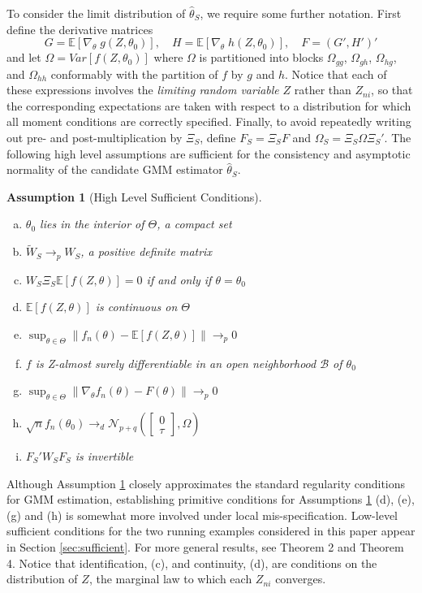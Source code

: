 \documentclass[12pt]{article}
\newcommand{\expect}{\mathbb{E}}
\newtheorem{assump}{Assumption}[section]
\theoremstyle{definition}
\begin{document}
To consider the limit distribution of $\widehat{\theta}_S$, we require some further notation. First define the derivative matrices
	$$G = \expect\left[\nabla_{\theta} \; g(Z,\theta_0)\right], \quad H = \expect\left[\nabla_{\theta} \; h(Z,\theta_0)\right], \quad F = (G', H')'$$
and let $\Omega = Var\left[ f(Z,\theta_0) \right]$ where $\Omega$ is partitioned into blocks $\Omega_{gg}$, $\Omega_{gh}$, $\Omega_{hg}$, and $\Omega_{hh}$ conformably with the partition of $f$ by $g$ and $h$. Notice that each of these expressions involves the \emph{limiting random variable} $Z$ rather than $Z_{ni}$, so that the corresponding expectations are taken with respect to a distribution for which all moment conditions are correctly specified. Finally, to avoid repeatedly writing out pre- and post-multiplication by $\Xi_S$, define $F_S = \Xi_S F$ and $\Omega_S = \Xi_S \Omega\Xi_S'$. The following high level assumptions are sufficient for the consistency and asymptotic normality of the candidate GMM estimator $\widehat{\theta}_S$. 
\begin{assump}[High Level Sufficient Conditions]
\label{assump:highlevel} 
\mbox{}
	\begin{enumerate}[(a)]
		\item $\theta_0$ lies in the interior of $\Theta$, a compact set
		\item $\widetilde{W}_S \rightarrow_{p} W_S$, a positive definite matrix
		\item $W_S \Xi_S \expect[f(Z,\theta)]=0$ if and only if $\theta = \theta_0$
		\item $\expect[f(Z,\theta)]$ is continuous on $\Theta$
		\item $\sup_{\theta \in \Theta}\| f_n(\theta)- \expect[f(Z,\theta)]\|\rightarrow_{p} 0$
		\item $f$ is Z-almost surely differentiable in an open neighborhood $\mathcal{B}$ of $\theta_0$
		\item $\sup_{\theta \in \Theta} \|\nabla_{\theta}f_n(\theta) - F(\theta)\|\rightarrow_{p} 0$
		\item $\sqrt{n}f_n(\theta_0) \rightarrow_d\mathcal{N}_{p+q}\left( \left[\begin{array}{c}0\\ \tau \end{array} \right], \Omega \right)$
		\item $F_S'W_SF_S$ is invertible
	\end{enumerate}
\end{assump}

Although Assumption \ref{assump:highlevel} closely approximates the standard regularity conditions for GMM estimation, establishing primitive conditions for Assumptions \ref{assump:highlevel} (d), (e), (g) and (h) is somewhat more involved under local mis-specification. Low-level sufficient conditions for the two running examples considered in this paper appear in Section \ref{sec:sufficient}. For more general results, see \cite{Andrews1988} Theorem 2 and \cite{Andrews1992} Theorem 4.  Notice that identification, (c), and continuity, (d), are conditions on the distribution of $Z$, the marginal law to which each $Z_{ni}$ converges. 
\end{document}
